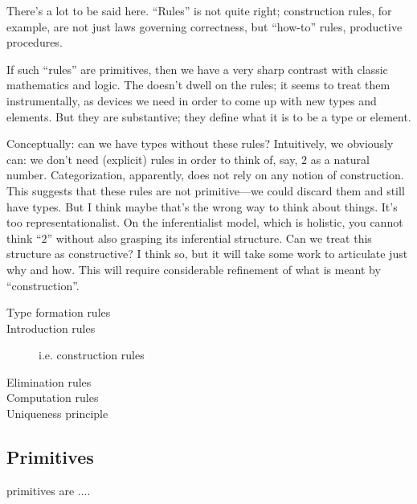 \begin{ednote}
  There's a lot to be said here.  ``Rules'' is not quite right;
  construction rules, for example, are not just laws governing
  correctness, but ``how-to'' rules, productive procedures.

  If such ``rules'' are primitives, then we have a very sharp contrast
  with classic mathematics and logic.  The \HoTTB{} doesn't dwell on
  the rules; it seems to treat them instrumentally, as devices we need
  in order to come up with new types and elements.  But they are
  substantive; they define what it is to be a type or element.

  Conceptually: can we have types without these rules?  Intuitively,
  we obviously can: we don't need (explicit) rules in order to think
  of, say, $2$ as a natural number.  Categorization, apparently, does
  not rely on any notion of construction.  This suggests that these
  rules are not primitive---we could discard them and still have
  types.  But I think maybe that's the wrong way to think about
  things.  It's too representationalist.  On the inferentialist model,
  which is holistic, you cannot think ``$2$'' without also grasping
  its inferential structure.  Can we treat this structure as
  constructive?  I think so, but it will take some work to articulate
  just why and how.  This will require considerable refinement of what
  is meant by ``construction''.
\end{ednote}

\begin{description}
\item [Type formation rules]
\item [Introduction rules] i.e. construction rules
\item [Elimination rules]
\item [Computation rules]
\item [Uniqueness principle]
\end{description}

\subsection{\HoTT Primitives}
\label{subs:hottprimitives}

\HoTT primitives are ....

